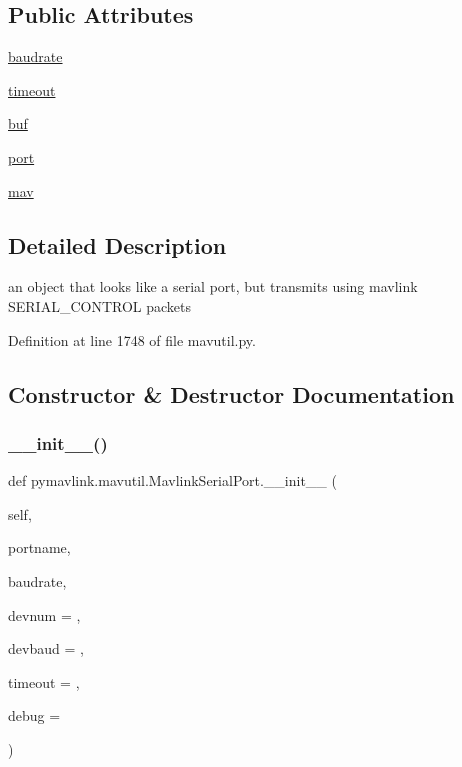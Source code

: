 \subsection*{Public Attributes}
\begin{DoxyCompactItemize}
\item 
\mbox{\hyperlink{classpymavlink_1_1mavutil_1_1MavlinkSerialPort_ab3e0c5df3be011a0a9f99cc75a87ac55}{baudrate}}
\item 
\mbox{\hyperlink{classpymavlink_1_1mavutil_1_1MavlinkSerialPort_a4d25142b726458574a0e15fc6cf97d04}{timeout}}
\item 
\mbox{\hyperlink{classpymavlink_1_1mavutil_1_1MavlinkSerialPort_ab05f0e2119e3e65e0f72b7ba79c28ca6}{buf}}
\item 
\mbox{\hyperlink{classpymavlink_1_1mavutil_1_1MavlinkSerialPort_ad3f20565efc5c2bdfd09fc94dc1190a6}{port}}
\item 
\mbox{\hyperlink{classpymavlink_1_1mavutil_1_1MavlinkSerialPort_a49f58191e0fec19e33e4f2c4c4217dce}{mav}}
\end{DoxyCompactItemize}


\subsection{Detailed Description}
\begin{DoxyVerb}an object that looks like a serial port, but
transmits using mavlink SERIAL_CONTROL packets\end{DoxyVerb}
 

Definition at line 1748 of file mavutil.\+py.



\subsection{Constructor \& Destructor Documentation}
\mbox{\label{classpymavlink_1_1mavutil_1_1MavlinkSerialPort_ab3d1f1a5a2d3f30628aa6b2e5c8822f0}} 
\subsubsection{\texorpdfstring{\_\_init\_\_()}{\_\_init\_\_()}}
{\footnotesize\ttfamily def pymavlink.\+mavutil.\+Mavlink\+Serial\+Port.\+\_\+\+\_\+init\+\_\+\+\_\+ (\begin{DoxyParamCaption}\item[{}]{self,  }\item[{}]{portname,  }\item[{}]{baudrate,  }\item[{}]{devnum = {},  }\item[{}]{devbaud = {},  }\item[{}]{timeout = {},  }\item[{}]{debug = {} }\end{DoxyParamCaption})}



